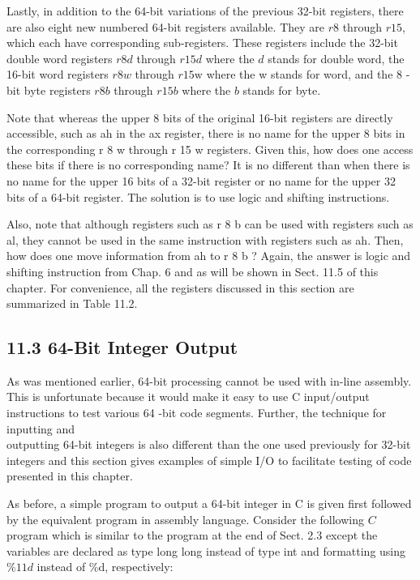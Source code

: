 \documentclass[10pt]{article}
\begin{document}
Lastly, in addition to the 64-bit variations of the previous 32-bit registers, there are also eight new numbered 64-bit registers available. They are $r 8$ through $r 15$, which each have corresponding sub-registers. These registers include the 32-bit double word registers $r 8 d$ through $r 15 d$ where the $d$ stands for double word, the 16-bit word registers $r 8 w$ through $r 15 \mathrm{w}$ where the w stands for word, and the 8 -bit byte registers $r 8 b$ through $r 15 b$ where the $b$ stands for byte.

Note that whereas the upper 8 bits of the original 16-bit registers are directly accessible, such as ah in the ax register, there is no name for the upper 8 bits in the corresponding r 8 w through r 15 w registers. Given this, how does one access these bits if there is no corresponding name? It is no different than when there is no name for the upper 16 bits of a 32-bit register or no name for the upper 32 bits of a 64-bit register. The solution is to use logic and shifting instructions.

Also, note that although registers such as r 8 b can be used with registers such as al, they cannot be used in the same instruction with registers such as ah. Then, how does one move information from ah to r 8 b ? Again, the answer is logic and shifting instruction from Chap. 6 and as will be shown in Sect. 11.5 of this chapter. For convenience, all the registers discussed in this section are summarized in Table 11.2.

\subsection*{11.3 64-Bit Integer Output}
As was mentioned earlier, 64-bit processing cannot be used with in-line assembly. This is unfortunate because it would make it easy to use C input/output instructions to test various 64 -bit code segments. Further, the technique for inputting and\\
outputting 64-bit integers is also different than the one used previously for 32-bit integers and this section gives examples of simple I/O to facilitate testing of code presented in this chapter.

As before, a simple program to output a 64-bit integer in C is given first followed by the equivalent program in assembly language. Consider the following $C$ program which is similar to the program at the end of Sect. 2.3 except the variables are declared as type long long instead of type int and formatting using $\% 11 d$ instead of \%d, respectively:
\end{document}
